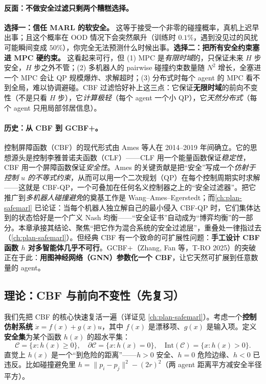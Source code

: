 \paragraph{反面：不做安全过滤只剩两个糟糕选择。}
\textbf{选择一：信任 MARL 的软安全。} 这等于接受一个非零的碰撞概率，真机上迟早出事；且这个概率在 OOD 情况下会突然飙升（训练时 $0.1\%$，遇到没见过的风扰可能瞬间变成 $50\%$），你完全无法预测什么时候出事。\textbf{选择二：把所有安全约束塞进 MPC 硬约束。} 这看起来可行，但 (1) MPC 是\emph{有限时域}的，只保证未来 $H$ 步安全，$H$ 步之外不管；(2) 多机器人的 pairwise 碰撞约束数量随 $N^2$ 增长，全塞进一个 MPC 会让 QP 规模爆炸、求解超时；(3) 分布式时每个 agent 的 MPC 看不到全局，难以协调避碰。CBF 过滤恰好补上这三点：它保证\textbf{无限时域}的前向不变性（不是只看 $H$ 步），它\emph{计算极轻}（每个 agent 一个小 QP），它\emph{天然分布式}（每个 agent 只用局部邻居信息）。

\paragraph{历史：从 CBF 到 GCBF+。}
控制屏障函数（CBF）的现代形式由 Ames 等人在 2014--2019 年间确立\cite{ames2017cbf,ames2019cbf}。它的思想源头是控制李雅普诺夫函数（CLF）——CLF 用一个能量函数保证\emph{稳定性}，CBF 用一个屏障函数保证\emph{安全性}。Ames 的关键贡献是把“安全”写成一个\emph{仿射于控制 $u$ 的不等式约束}，从而可以用一个二次规划（QP）在每个控制周期实时求解——这就是 CBF-QP，一个可叠加在任何名义控制器之上的“安全过滤器”。把它推广到\emph{多机器人碰撞避免}的奠基工作是 Wang--Ames--Egerstedt\cite{wang2017safety}；而\cref{ch:plan-safemarl} 已论证：当每个机器人独立解自己的最小侵入 CBF-QP 时，它们集体达到的状态恰好是一个广义 Nash 均衡——“安全证书”自动成为“博弈均衡”的一部分。本章承接其结论、聚焦“把它作为混合系统的安全过滤层”，重叠处一律指过去（\cref{ch:plan-safemarl}）。但经典 CBF 有一个致命的可扩展性问题：\textbf{手工设计 CBF 函数 $h$ 对多智能体几乎不可行}。GCBF+\cite{zhang2025gcbfplus}（Zhang, Fan 等，T-RO 2025）的突破正在于此：\textbf{用图神经网络（GNN）参数化一个 CBF}，让它天然可扩展到任意数量的 agent。

\subsection{理论：CBF 与前向不变性（先复习）}
\label{sec:mh-cbf-recall}

我们先把 CBF 的核心快速复活一遍（详证见 \cref{ch:plan-safemarl}）。考虑一个\textbf{控制仿射系统} $\dot x=f(x)+g(x)u$，其中 $f(x)$ 是漂移项、$g(x)$ 是输入项。定义\textbf{安全集}为某个函数 $h(x)$ 的超水平集：
\begin{equation}
  \mathcal{C}=\{x:h(x)\ge0\},\quad \partial\mathcal{C}=\{x:h(x)=0\},\quad \mathrm{Int}(\mathcal{C})=\{x:h(x)>0\}.
  \label{eq:mh-safe-set}
\end{equation}
直觉上 $h(x)$ 是一个“到危险的距离”——$h>0$ 安全、$h=0$ 危险边缘、$h<0$ 已违反。比如碰撞避免里 $h=\|p_i-p_j\|^2-(2r)^2$（两 agent 距离平方减安全半径平方）。

